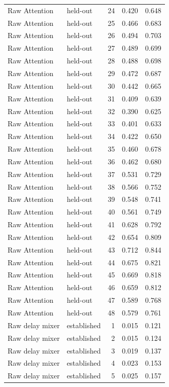 \begin{tabular}{llrrr}
Raw Attention & held-out & 24 & 0.420 & 0.648 \\
Raw Attention & held-out & 25 & 0.466 & 0.683 \\
Raw Attention & held-out & 26 & 0.494 & 0.703 \\
Raw Attention & held-out & 27 & 0.489 & 0.699 \\
Raw Attention & held-out & 28 & 0.488 & 0.698 \\
Raw Attention & held-out & 29 & 0.472 & 0.687 \\
Raw Attention & held-out & 30 & 0.442 & 0.665 \\
Raw Attention & held-out & 31 & 0.409 & 0.639 \\
Raw Attention & held-out & 32 & 0.390 & 0.625 \\
Raw Attention & held-out & 33 & 0.401 & 0.633 \\
Raw Attention & held-out & 34 & 0.422 & 0.650 \\
Raw Attention & held-out & 35 & 0.460 & 0.678 \\
Raw Attention & held-out & 36 & 0.462 & 0.680 \\
Raw Attention & held-out & 37 & 0.531 & 0.729 \\
Raw Attention & held-out & 38 & 0.566 & 0.752 \\
Raw Attention & held-out & 39 & 0.548 & 0.741 \\
Raw Attention & held-out & 40 & 0.561 & 0.749 \\
Raw Attention & held-out & 41 & 0.628 & 0.792 \\
Raw Attention & held-out & 42 & 0.654 & 0.809 \\
Raw Attention & held-out & 43 & 0.712 & 0.844 \\
Raw Attention & held-out & 44 & 0.675 & 0.821 \\
Raw Attention & held-out & 45 & 0.669 & 0.818 \\
Raw Attention & held-out & 46 & 0.659 & 0.812 \\
Raw Attention & held-out & 47 & 0.589 & 0.768 \\
Raw Attention & held-out & 48 & 0.579 & 0.761 \\
Raw delay mixer & established & 1 & 0.015 & 0.121 \\
Raw delay mixer & established & 2 & 0.015 & 0.124 \\
Raw delay mixer & established & 3 & 0.019 & 0.137 \\
Raw delay mixer & established & 4 & 0.023 & 0.153 \\
Raw delay mixer & established & 5 & 0.025 & 0.157 \\

\end{tabular}
